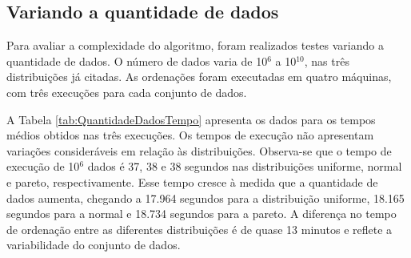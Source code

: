 




\subsection{Variando a quantidade de dados}

Para avaliar a complexidade do algoritmo, foram realizados testes variando a quantidade de dados. O número de dados varia de 10$^6$ a 10$^{10}$, nas três distribuições já citadas. As ordenações foram executadas em quatro máquinas, com três execuções para cada conjunto de dados. 

A Tabela \ref{tab:QuantidadeDadosTempo} apresenta os dados para os tempos médios obtidos nas três execuções. Os tempos de execução não apresentam variações consideráveis em relação às distribuições. Observa-se que o tempo de execução de 10$^6$ dados é 37, 38 e 38 segundos nas distribuições uniforme, normal e pareto, respectivamente. Esse tempo cresce à medida que a quantidade de dados aumenta, chegando a 17.964 segundos para a distribuição uniforme, 18.165 segundos para a normal e 18.734 segundos para a pareto. A diferença no tempo de ordenação entre as diferentes distribuições é de quase 13 minutos e reflete a variabilidade do conjunto de dados. %

